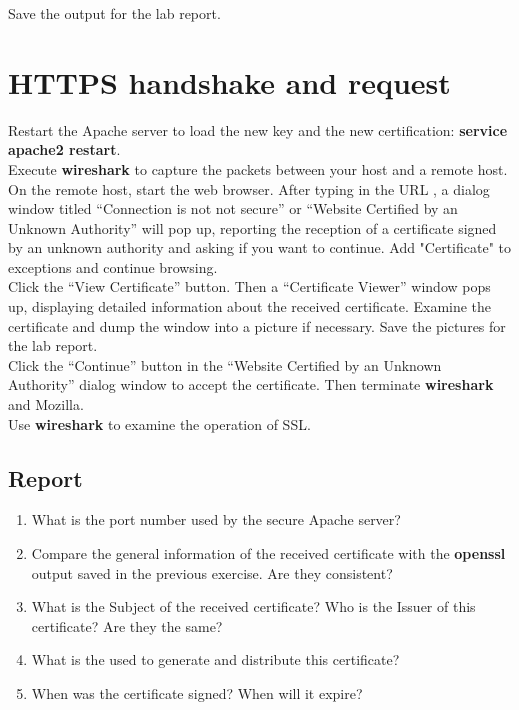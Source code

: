 \documentclass{../UTNetLab}
\begin{document}
	Save the output for the lab report.

\section{HTTPS handshake and request}
	Restart the Apache server to load the new key and the new certification: \textbf{service apache2 restart}.\\
	Execute \textbf{wireshark} to capture the packets between your host and a remote host.\\
	On the remote host, start the  web browser. After typing in the URL , a dialog window titled “Connection is not not secure” or “Website Certified by an Unknown Authority” will pop up, reporting the reception of a certificate signed by an unknown authority and asking if you want to continue. Add "Certificate" to exceptions and continue browsing.\\
	Click the “View Certificate” button. Then a “Certificate Viewer” window pops up, displaying detailed information about the received certificate. Examine the certificate and dump the window into a picture if necessary. Save the pictures for the lab report.\\
	Click the “Continue” button in the “Website Certified by an Unknown Authority” dialog window to accept the certificate. Then terminate \textbf{wireshark} and Mozilla.\\
	Use \textbf{wireshark} to examine the operation of SSL.
	
	
	\subsection*{Report}
	\begin{enumerate}
		\setlength{\itemindent}{0pt}
		\item What is the port number used by the secure Apache server?
		\item Compare the general information of the received certificate with the \textbf{openssl} output saved in the previous exercise. Are they consistent?
		\item What is the Subject of the received certificate? Who is the Issuer of this certificate? Are they the same?
		\item What is the  used to generate and distribute this certificate?
		\item When was the certificate signed? When will it expire?
	\end{enumerate}
\end{document}
